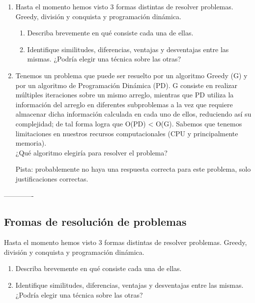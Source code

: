 \documentclass[titlepage,a4paper]{article}
\begin{document}
\begin{enumerate}
\item Hasta el momento hemos visto 3 formas distintas de resolver problemas.
    Greedy, división y conquista y programación dinámica. \begin{enumerate}
        \item Describa brevemente en qué consiste cada una de ellas.
        \item Identifique similitudes, diferencias, ventajas y
        desventajas entre las mismas. ¿Podría elegir una técnica sobre las otras?
    \end{enumerate}
\item Tenemos un problema que puede ser resuelto por un algoritmo Greedy (G) y
    por un algoritmo de Programación Dinámica (PD). G consiste en realizar múltiples
    iteraciones sobre un mismo arreglo, mientras que PD utiliza la información del
    arreglo en diferentes subproblemas a la vez que requiere almacenar dicha
    información calculada en cada uno de ellos, reduciendo así su complejidad;
    de tal forma logra que O(PD) < O(G). Sabemos que tenemos limitaciones en nuestros
    recursos computacionales (CPU y principalmente memoria).\\
    ¿Qué algoritmo elegiría para resolver el problema?\par
    Pista: probablemente no haya una respuesta correcta para este problema, solo justificaciones correctas.
\end{enumerate}

-------------

\newpage\subsection{Fromas de resolución de problemas}\label{sec:parte2_1}
\begin{tcolorbox}[colback=blue!5!white,colframe=blue!75!black,title=Enunciado 2.1]
    Hasta el momento hemos visto 3 formas distintas de resolver problemas.
    Greedy, división y conquista y programación dinámica. \begin{enumerate}
        \item Describa brevemente en qué consiste cada una de ellas.
        \item Identifique similitudes, diferencias, ventajas y
        desventajas entre las mismas. ¿Podría elegir una técnica sobre las otras?
    \end{enumerate}
\end{tcolorbox}
\end{document}
